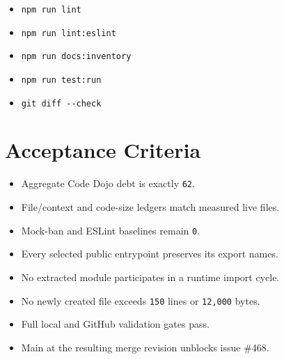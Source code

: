 \begin{itemize}
\item
  \texttt{n\allowbreak{}p\allowbreak{}m\allowbreak{} \allowbreak{}r\allowbreak{}u\allowbreak{}n\allowbreak{} \allowbreak{}l\allowbreak{}i\allowbreak{}n\allowbreak{}t}
\item
  \texttt{n\allowbreak{}p\allowbreak{}m\allowbreak{} \allowbreak{}r\allowbreak{}u\allowbreak{}n\allowbreak{} \allowbreak{}l\allowbreak{}i\allowbreak{}n\allowbreak{}t\allowbreak{}:\allowbreak{}e\allowbreak{}s\allowbreak{}l\allowbreak{}i\allowbreak{}n\allowbreak{}t}
\item
  \texttt{n\allowbreak{}p\allowbreak{}m\allowbreak{} \allowbreak{}r\allowbreak{}u\allowbreak{}n\allowbreak{} \allowbreak{}d\allowbreak{}o\allowbreak{}c\allowbreak{}s\allowbreak{}:\allowbreak{}i\allowbreak{}n\allowbreak{}v\allowbreak{}e\allowbreak{}n\allowbreak{}t\allowbreak{}o\allowbreak{}r\allowbreak{}y}
\item
  \texttt{n\allowbreak{}p\allowbreak{}m\allowbreak{} \allowbreak{}r\allowbreak{}u\allowbreak{}n\allowbreak{} \allowbreak{}t\allowbreak{}e\allowbreak{}s\allowbreak{}t\allowbreak{}:\allowbreak{}r\allowbreak{}u\allowbreak{}n}
\item
  \texttt{g\allowbreak{}i\allowbreak{}t\allowbreak{} \allowbreak{}d\allowbreak{}i\allowbreak{}f\allowbreak{}f\allowbreak{} \allowbreak{}-\allowbreak{}-\allowbreak{}c\allowbreak{}h\allowbreak{}e\allowbreak{}c\allowbreak{}k}
\end{itemize}

\section{Acceptance Criteria}\label{record-246-acceptance-criteria}

\begin{itemize}
\tightlist
\item
  Aggregate Code Dojo debt is exactly \texttt{6\allowbreak{}2}.
\item
  File/context and code-size ledgers match measured live files.
\item
  Mock-ban and ESLint baselines remain \texttt{0}.
\item
  Every selected public entrypoint preserves its export names.
\item
  No extracted module participates in a runtime import cycle.
\item
  No newly created file exceeds \texttt{1\allowbreak{}5\allowbreak{}0} lines or \texttt{1\allowbreak{}2\allowbreak{},\allowbreak{}0\allowbreak{}0\allowbreak{}0} bytes.
\item
  Full local and GitHub validation gates pass.
\item
  Main at the resulting merge revision unblocks issue \#468.
\end{itemize}

